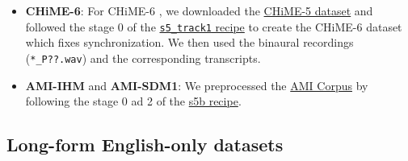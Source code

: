 \documentclass[nohyperref]{article}
\theoremstyle{plain}
\theoremstyle{definition}
\theoremstyle{remark}
\begin{document}
\begin{itemize}
\item \textbf{CHiME-6}: For CHiME-6 \cite{watanabe2020chime}, we downloaded the \href{https://spandh.dcs.shef.ac.uk//chime_challenge/CHiME5/download.html}{CHiME-5 dataset} and followed the stage 0 of the \href{https://github.com/kaldi-asr/kaldi/tree/master/egs/chime6/s5_track1}{\texttt{s5\_track1} recipe} to create the CHiME-6 dataset which fixes synchronization. We then used the binaural recordings (\texttt{*\_P??.wav}) and the corresponding transcripts.

\item \textbf{AMI-IHM} and \textbf{AMI-SDM1}: We preprocessed the \href{https://groups.inf.ed.ac.uk/ami/corpus/overview.shtml}{AMI Corpus} by following the stage 0 ad 2 of the \href{https://github.com/kaldi-asr/kaldi/tree/master/egs/ami/s5b}{s5b recipe}.

\end{itemize}

\subsection{Long-form English-only datasets}
\end{document}
